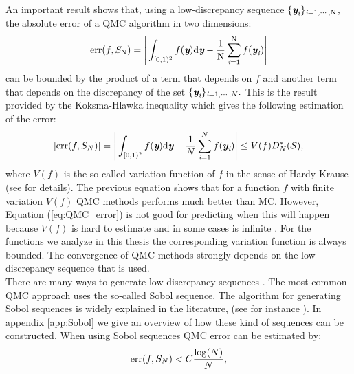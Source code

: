 An important result shows that, using a low-discrepancy sequence $\{\textit{\textbf{y}}_{\textit{i}}\}_{\textit{i}=1, \cdots, \textrm{N}}$, the absolute error of a QMC algorithm in two dimensions:
\begin{equation}
\textrm{err}(f, S_{\textrm{N}}) =\Bigg|\int_{[0,1)^2}f(\textit{\textbf{y}}) \textrm{d}\textit{\textbf{y}}-\frac{1}{\textrm{N}}\sum_{\textit{i}=1}^{\textrm{N}}f(\textit{\textbf{y}}_{\textit{i}})\Bigg|
\end{equation}
 can be bounded by the product of a term that depends on $f$ and another term that depends on the discrepancy of the set $\{\textit{\textbf{y}}_{\textit{i}}\}_{\textit{i}=1, \cdots, N}.$ This is the result provided by the Koksma-Hlawka inequality which gives the following estimation of the error:
\begin{equation}\label{eq:QMC_error}
|\textrm{err}(f, S_{N})|= \Bigg|\int_{[0,1)^2}f(\textit{\textbf{y}}) \textrm{d}\textit{\textbf{y}}-\frac{1}{N}\sum_{\textit{i}=1}^{N}f(\textit{\textbf{y}}_{\textit{i}})\Bigg|\leq V(f)D^*_N({\mathcal{S}}),
\end{equation}
where $V(f)$ is the so-called variation function of $f$ in the sense of Hardy-Krause (see \cite{brandolini2013koksma} for details). 
The previous equation shows that for a function $f$ with finite variation $V(f)$ QMC methods performs much better than MC. However, Equation (\ref{eq:QMC_error}) is not good for predicting when this will happen because $V(f)$ is hard to estimate and in some cases is infinite \cite{wang2008low}. 
For the functions we analyze in this thesis the corresponding variation function is always bounded. 
The convergence of QMC methods strongly depends on the low-discrepancy sequence that is used.\\ \indent
There are many ways to generate low-discrepancy sequences \cite{dalal2008low}. The most common QMC approach uses the so-called Sobol sequence. The algorithm for generating Sobol sequences is widely explained in the literature, (see for instance \cite{bratley1988algorithm}). In appendix \ref{app:Sobol} we give an overview of how these kind of sequences can be constructed. When using Sobol sequences QMC error can be estimated by:
\begin{equation}
\textrm{err}(f, S_{N})<C \frac{\log(N)}{N}, 
\end{equation}
